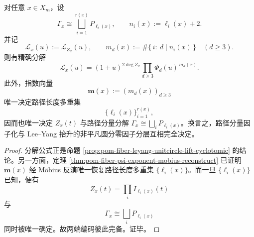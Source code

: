 \begin{theorem}\label{thm:conclusion-fiber-leyang-cyclotomic-fully-faithful-encoding}
对任意 \(x\in X_m\)，设
\[
\Gamma_x\cong \bigsqcup_{i=1}^{r(x)}P_{\ell_i(x)},
\qquad
n_i(x):=\ell_i(x)+2.
\]
并记
\[
\mathcal L_x(u):=\mathcal L_{Z_x}(u),
\qquad
m_d(x):=\#\{\,i:\ d\mid n_i(x)\,\}
\quad(d\ge 3).
\]
则有精确分解
\[
\mathcal L_x(u)
=(1+u)^{2\deg Z_x}\prod_{d\ge 3}\Phi_d(u)^{\,m_d(x)}.
\]
此外，指数向量
\[
\mathbf m(x):=(m_d(x))_{d\ge 3}
\]
唯一决定路径长度多重集
\[
\{\ell_i(x)\}_{i=1}^{r(x)},
\]
因而也唯一决定 \(Z_x(t)\) 与路径分量分解 \(\Gamma_x\cong\bigsqcup_i P_{\ell_i(x)}\)。换言之，路径分量因子化与 Lee--Yang 抬升的非平凡圆分零因子分层互相完全决定。
\end{theorem}
\begin{proof}
分解公式正是命题 \ref{prop:pom-fiber-leyang-unitcircle-lift-cyclotomic} 的结论。另一方面，定理 \ref{thm:pom-fiber-psi-exponent-mobius-reconstruct} 已证明 \(\mathbf m(x)\) 经 Möbius 反演唯一恢复路径长度多重集 \(\{\ell_i(x)\}\)。而一旦 \(\{\ell_i(x)\}\) 已知，便有
\[
Z_x(t)=\prod_i I_{\ell_i(x)}(t)
\]
与
\[
\Gamma_x\cong\bigsqcup_i P_{\ell_i(x)}
\]
同时被唯一确定。故两端编码彼此完备。证毕。
\end{proof}


